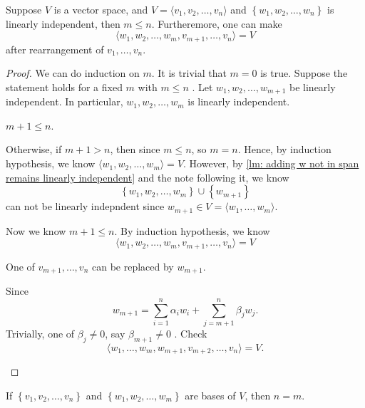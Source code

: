 \begin{theorem} \label{thm: sizeof(linearly ind.) less than sizeof(bases) and extend basis}
    Suppose \(V\) is a vector space, and \(V = \langle v_1, v_2, \dots , v_n \rangle \)  and \(\left\{ w_1, w_2, \dots , w_n \right\} \) is linearly independent, then \(m \le n\). Furtheremore, one can make 
    \[
        \langle w_1, w_2, \dots , w_m, v_{m+1}, \dots , v_n \rangle = V 
    \] after rearrangement of \(v_1, \dots , v_n\). 
\end{theorem}
\begin{proof}
    We can do induction on \(m\). It is trivial that \(m=0\) is true. Suppose the statement holds for a fixed \(m\) with \(m \le n\) . Let \(w_1, w_2, \dots , w_{m+1}\) be linearly independent.  In particular, \(w_1, w_2, \dots , w_m\) is linearly independent. 
    \begin{claim}
        \(m+1 \le n\). 
    \end{claim} 
    \begin{explanation}
        Otherwise, if \(m+1 > n\), then since \(m \le n\), so \(m = n\). Hence, by induction hypothesis, we know \(\langle w_1, w_2, \dots , w_m \rangle = V \). However, by \autoref{lm: adding w not in span remains linearly independent} and the note following it, we know 
        \[
            \left\{ w_1, w_2, \dots , w_m \right\} \cup \left\{ w_{m+1} \right\}  
        \] can not be linearly indepndent since \(w_{m+1} \in V = \langle w_1, \dots , w_m \rangle \).
    \end{explanation}

    Now we know \(m+1 \le n\). By induction hypothesis, we know 
    \[
        \langle w_1, w_2, \dots , w_m, v_{m+1}, \dots , v_n \rangle = V
    \] 
    \begin{claim}
        One of \(v_{m+1}, \dots , v_n\) can be replaced by \(w_{m+1}\).  
    \end{claim}
    \begin{explanation}
        Since 
        \[
            w_{m+1} = \sum_{i=1}^n \alpha _i w_i + \sum_{j=m+1}^n \beta _j w_j.  
        \]
        Trivially, one of \(\beta _j \neq 0\), say \(\beta _{m+1} \neq 0\) . Check 
        \[
            \langle w_1, \dots , w_m, w_{m+1}, v_{m+2}, \dots , v_n  \rangle = V.
        \] 
    \end{explanation}
\end{proof}

\begin{corollary} \label{cl: basis size unique}
    If \(\left\{ v_1, v_2, \dots , v_n \right\} \) and \(\left\{ w_1, w_2, \dots , w_m \right\} \) are bases of \(V\), then \(n = m\).    
\end{corollary}

